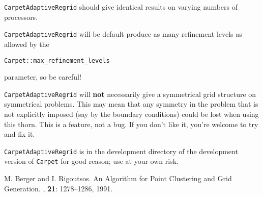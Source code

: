 {\tt CarpetAdaptiveRegrid} should give identical results on varying
numbers of processors.

{\tt CarpetAdaptiveRegrid} will be default produce as many refinement
levels as allowed by the

 {\tt Carpet::max\_refinement\_levels}
 
 parameter, so be careful!

{\tt CarpetAdaptiveRegrid} will {\bf not} necessarily give a
symmetrical grid structure on symmetrical problems. This may mean that
any symmetry in the problem that is not explicitly imposed (say by the
boundary conditions) could be lost when using this thorn. This is a
feature, not a bug. If you don't like it, you're welcome to try and
fix it.

{\tt CarpetAdaptiveRegrid} is in the development directory of the
development version of {\tt Carpet} for good reason; use at your own
risk.

\begin{thebibliography}{9}

{M. Berger and I. Rigoutsos. 
\newblock An {A}lgorithm for {P}oint {C}lustering and {G}rid
{G}eneration. 
, {\bf
  21}: 1278--1286, 1991.}

\end{thebibliography}



